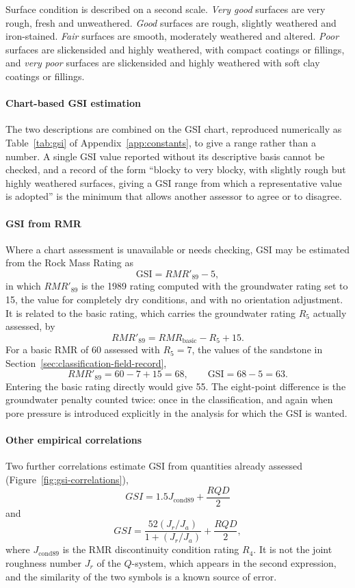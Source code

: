 Surface condition is described on a second scale. \emph{Very good} surfaces
are very rough, fresh and unweathered. \emph{Good} surfaces are rough,
slightly weathered and iron-stained. \emph{Fair} surfaces are smooth,
moderately weathered and altered. \emph{Poor} surfaces are slickensided and
highly weathered, with compact coatings or fillings, and \emph{very poor}
surfaces are slickensided and highly weathered with soft clay coatings or
fillings.

\paragraph{Chart-based GSI estimation}
The two descriptions are combined on the GSI chart, reproduced numerically as
Table~\ref{tab:gsi} of Appendix~\ref{app:constants}, to give a range rather
than a number. A single GSI value reported without
its descriptive basis cannot be checked, and a record of the form ``blocky to
very blocky, with slightly rough but highly weathered surfaces, giving a GSI
range from which a representative value is adopted'' is the minimum that
allows another assessor to agree or to disagree.

\paragraph{GSI from RMR}
Where a chart assessment is unavailable or needs checking, GSI may be
estimated from the Rock Mass Rating as
\[
\text{GSI} = RMR'_{89} - 5 ,
\]
in which \(RMR'_{89}\) is the 1989 rating computed with the groundwater rating
set to 15, the value for completely dry conditions, and with no orientation
adjustment. It is related to the basic rating, which carries the groundwater
rating \(R_5\) actually assessed, by
\[
RMR'_{89} = RMR_{\text{basic}} - R_5 + 15 .
\]
For a basic RMR of 60 assessed with \(R_5 = 7\), the values of the sandstone
in Section~\ref{sec:classification-field-record},
\[
RMR'_{89} = 60 - 7 + 15 = 68,
\qquad
\text{GSI} = 68 - 5 = 63 .
\]
Entering the basic rating directly would give 55. The eight-point difference
is the groundwater penalty counted twice: once in the classification, and
again when pore pressure is introduced explicitly in the analysis for which
the GSI is wanted.

\paragraph{Other empirical correlations}
Two further correlations estimate GSI from quantities already assessed
(Figure~\ref{fig:gsi-correlations}),
\[
GSI = 1.5J_{\text{cond89}} + \frac{RQD}{2}
\]
and
\[
GSI =
\frac{52(J_r/J_a)}
{1+(J_r/J_a)}
+
\frac{RQD}{2} ,
\]
where \(J_{\text{cond89}}\) is the RMR discontinuity condition rating \(R_4\).
It is not the joint roughness number \(J_r\) of the $Q$-system, which appears
in the second expression, and the similarity of the two symbols is a known
source of error.

